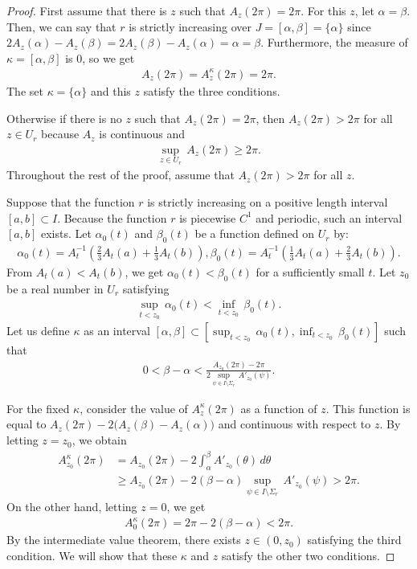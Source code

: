 \documentclass{amsart}
\theoremstyle{plain}
\theoremstyle{definition}
\theoremstyle{remark}
\begin{document}
\begin{proof}%
First assume that there is $z$ such that $A_z(2\pi)=2\pi$.
For this $z$, let $\alpha=\beta$.
Then, we can say that $r$ is strictly increasing over $J=[\alpha,\beta]=\{\alpha\}$ since $2A_z(\alpha)-A_z(\beta)=2A_z(\beta)-A_z(\alpha)=\alpha=\beta$.
Furthermore, the measure of $\kappa=[\alpha,\beta]$ is $0$, so we get
\begin{align*}
A_z(2\pi)=A_z^{\kappa}(2\pi)=2\pi.
\end{align*}
The set $\kappa=\{\alpha\}$ and this $z$ satisfy the three conditions.

Otherwise if there is no $z$ such that $A_z(2\pi)=2\pi$, then $A_z(2\pi)>2\pi$ for all $z\in U_r$ because $A_z$ is continuous and
\begin{align*}
\sup_{z\in U_r}\,A_z(2\pi)\ge2\pi.
\end{align*}
Throughout the rest of the proof, assume that $A_z(2\pi)>2\pi$ for all $z$.

Suppose that the function $r$ is strictly increasing on a positive length interval $[a,b]\subset I$.
Because the function $r$ is piecewise $C^1$ and periodic, such an interval $[a,b]$ exists.
Let $\alpha_0(t)$ and $\beta_0(t)$ be a function defined on $U_r$ by:
\begin{align*}
\alpha_0(t)=A_t^{-1}\left(\frac23A_t(a)+\frac13A_t(b)\right),\beta_0(t)=A_t^{-1}\left(\frac13A_t(a)+\frac23A_t(b)\right).
\end{align*}
From $A_t(a)<A_t(b)$, we get $\alpha_0(t)<\beta_0(t)$ for a sufficiently small $t$.
Let $z_0$ be a real number in $U_r$ satisfying
\begin{align*}
\sup_{t<z_0}\,\alpha_0(t)<\inf_{t<z_0}\,\beta_0(t).
\end{align*}
Let us define $\kappa$ as an interval $[\alpha,\beta]\subset\left[\sup_{t<z_0}\,\alpha_0(t),\inf_{t<z_0}\,\beta_0(t)\right]$ such that
\begin{align*}
0<\beta-\alpha<\frac{A_{z_0}(2\pi)-2\pi}{2\sup_{\psi\in I\setminus\Sigma_r}\,A'_{z_0}(\psi)}.
\end{align*}

For the fixed $\kappa$, consider the value of $A_z^{\kappa}(2\pi)$ as a function of $z$.
This function is equal to $A_z(2\pi)-2\bigl(A_z(\beta)-A_z(\alpha)\bigr)$ and continuous with respect to $z$.
By letting $z=z_0$, we obtain
\begin{align*}
A_{z_0}^{\kappa}(2\pi)
&= A_{z_0}(2\pi)-2\int_{\alpha}^{\beta}A'_{z_0}(\theta)\,d\theta \\
&\ge A_{z_0}(2\pi)-2(\beta-\alpha)\sup_{\psi\in I\setminus\Sigma_r}\,A'_{z_0}(\psi) >2\pi.
\end{align*}
On the other hand, letting $z=0$, we get
\begin{align*}
A_0^{\kappa}(2\pi)=2\pi-2(\beta-\alpha)<2\pi.
\end{align*}
By the intermediate value theorem, there exists $z\in(0,z_0)$ satisfying the third condition.
We will show that these $\kappa$ and $z$ satisfy the other two conditions.


\end{proof}
\end{document}
